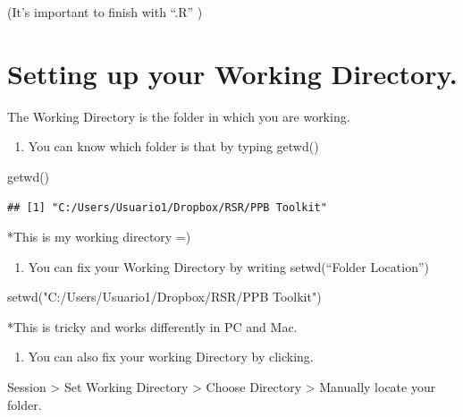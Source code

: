 \documentclass[
]{book}
\newenvironment{Shaded}{\begin{snugshade}}{\end{snugshade}}
\newcommand{\FunctionTok}[1]{\textcolor[rgb]{0.00,0.00,0.00}{#1}}
\newcommand{\NormalTok}[1]{#1}
\newcommand{\StringTok}[1]{\textcolor[rgb]{0.31,0.60,0.02}{#1}}
\providecommand{\tightlist}{%
  \setlength{\itemsep}{0pt}\setlength{\parskip}{0pt}}
\begin{document}
(It's important to finish with ``.R'' )

\hypertarget{setting-up-your-working-directory.}{%
\section{Setting up your Working Directory.}\label{setting-up-your-working-directory.}}

The Working Directory is the folder in which you are working.

\begin{enumerate}
\def\labelenumi{\arabic{enumi}.}
\tightlist
\item
  You can know which folder is that by typing getwd()
\end{enumerate}

\begin{Shaded}
\begin{Highlighting}[]
\FunctionTok{getwd}\NormalTok{()  }
\end{Highlighting}
\end{Shaded}

\begin{verbatim}
## [1] "C:/Users/Usuario1/Dropbox/RSR/PPB Toolkit"
\end{verbatim}

*This is my working directory =)

\begin{enumerate}
\def\labelenumi{\arabic{enumi}.}
\setcounter{enumi}{1}
\tightlist
\item
  You can fix your Working Directory by writing setwd(``Folder Location'')
\end{enumerate}

\begin{Shaded}
\begin{Highlighting}[]
\FunctionTok{setwd}\NormalTok{(}\StringTok{"C:/Users/Usuario1/Dropbox/RSR/PPB Toolkit"}\NormalTok{)}
\end{Highlighting}
\end{Shaded}

*This is tricky and works differently in PC and Mac.

\begin{enumerate}
\def\labelenumi{\arabic{enumi}.}
\setcounter{enumi}{2}
\tightlist
\item
  You can also fix your working Directory by clicking.
\end{enumerate}

Session \textgreater{} Set Working Directory \textgreater{} Choose Directory \textgreater{} Manually locate your folder.
\end{document}
